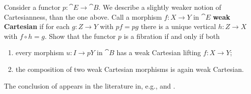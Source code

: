 \begin{exercise}
Consider a functor \(p: \cat{E} \to \cat{B}\).
We describe a slightly weaker notion of Cartesianness, than the one above.
Call a morphism \(f : X \to Y\) in \(\cat{E}\) \textbf{weak Cartesian} if for each \(g : Z \to Y\) with \(p f = p g\) there is a unique vertical \(h : Z \to X\) with \(f \circ h = g\).
Show that the functor \(p\) is a fibration if and only if both
\begin{enumerate}
\item
\label{ex:1.1.6.a}
every morphism \(u : I \to p Y\) in \(\cat{B}\) has a weak Cartesian lifting \(f : X \to Y\);
\item
\label{ex:1.1.6.b}
the composition of two weak Cartesian morphisms is again weak Cartesian.
\end{enumerate}
\end{exercise}

\begin{remark}
The conclusion of  appears in the literature in, e.g.,  \cite[Proposition~8.1.7]{MR1313497} and \cite[Proposition~2.5]{MR0213413}.
\end{remark}

